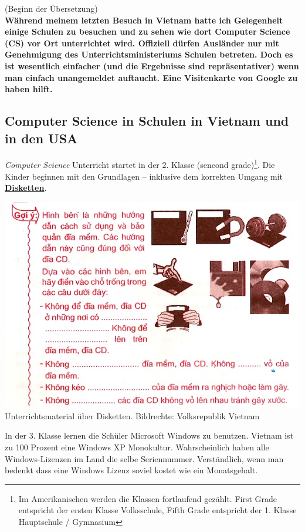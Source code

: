 (Beginn der Übersetzung) \\

\textbf{Während meinem letzten Besuch in Vietnam hatte ich Gelegenheit einige Schulen zu besuchen und zu sehen wie dort Computer Science (CS) vor Ort unterrichtet wird. Offiziell dürfen Ausländer nur mit Genehmigung des Unterrichtsministeriums Schulen betreten. Doch es ist wesentlich einfacher (und die Ergebnisse sind repräsentativer) wenn man einfach unangemeldet auftaucht. Eine Visitenkarte von Google zu haben hilft.}

\subsection*{Computer Science in Schulen in Vietnam und in den USA}


\textit{Computer Science} Unterricht startet in der 2. Klasse (sencond grade)\footnote{Im Amerikanischen werden die Klassen fortlaufend gez\"ahlt. First Grade entspricht der ersten Klasse Volksschule, Fifth Grade entspricht der 1. Klasse Hauptschule / Gymnasium}. Die Kinder beginnen mit den Grundlagen -- inklusive dem korrekten Umgang mit \href{http://de.wikipedia.org/wiki/Diskette}{\textbf{Disketten}}.
\begin{center}
\includegraphics[width=\linewidth]{vietnam/vietnam_disketten.jpg}
\footnotesize{Unterrichtsmaterial über Disketten. Bildrechte: Volksrepublik Vietnam}
\end{center}
In der 3. Klasse lernen die Schüler Microsoft Windows zu benutzen. Vietnam ist zu 100 Prozent eine Windows XP Monokultur. Wahrscheinlich haben alle Windows-Lizenzen im Land die selbe Seriennummer. Verständlich, wenn man bedenkt dass eine Windows Lizenz soviel kostet wie ein Monatsgehalt.

